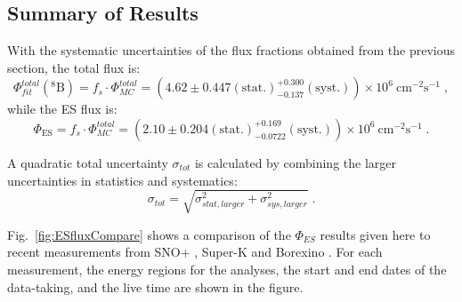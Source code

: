 \subsection{Summary of Results}\label{sect:solarESresults}

With the systematic uncertainties of the flux fractions obtained from the previous section, the total flux is:
\begin{equation}
{\Phi^{total}_{fit}(\mathrm{^8 B})=f_s\cdot \Phi^{total}_{MC}=(4.62\pm 0.447\mathrm{(stat.)}^{+0.300}_{-0.137}\mathrm{(syst.)})\times 10^6~\mathrm{cm^{-2}s^{-1}}}\; ,
\end{equation}
while the ES flux is:
\begin{equation}
\Phi_{\mathrm{ES}}=f_s\cdot \Phi^{total}_{MC}=(2.10\pm 0.204\mathrm{(stat.)}^{+0.169}_{-0.0722}\mathrm{(syst.)})\times 10^6~\mathrm{cm^{-2}s^{-1}}\; .
\end{equation}

A quadratic total uncertainty $\sigma_{tot}$ is calculated by combining the larger uncertainties in statistics and systematics:
\begin{equation}
\sigma_{tot}=\sqrt{\sigma^2_{stat,larger}+\sigma^2_{sys,larger}}\; .
\end{equation}

Fig.~\ref{fig:ESfluxCompare} shows a comparison of the $\Phi_{ES}$ results given here to recent measurements from SNO+ \cite{anderson2019measurement}, Super-K \cite{abe2016solar} and Borexino \cite{agostini2020improved}. For each measurement, the energy regions for the analyses, the start and end dates of the data-taking, and the live time are shown in the figure.

